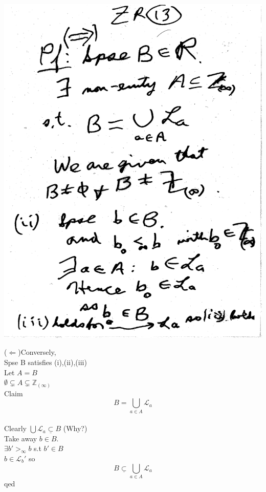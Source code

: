\documentclass[10pt,a4paper]{article}
\begin{document}
{{\begin{enumerate}[(ii)]
\includegraphics[scale=.5]{Pages/ZR_13}

\newpage
($\Leftarrow$)Conversely,
\\Spse B satisfies (i),(ii),(iii)
\\Let $A=B$
\\$\emptyset \subsetneq A \subsetneq \mathbb{Z}_{(\infty)}$
\\Claim $$B=\bigcup_{a \in A} \mathcal{L}_a $$ 
\\Clearly $ \bigcup \mathcal{L}_a \underline{\subset} B$ (Why?)
\\Take away $b \in B$. 
\\ $\exists b' >_\infty b$ s.t $b' \in B$
\\ $b \in \mathcal{L}_b{'}$ so
\\ $$B \underline{\subset} \bigcup_{a \in A} \mathcal{L}_a$$ qed


\end{enumerate}}}
\end{document}
